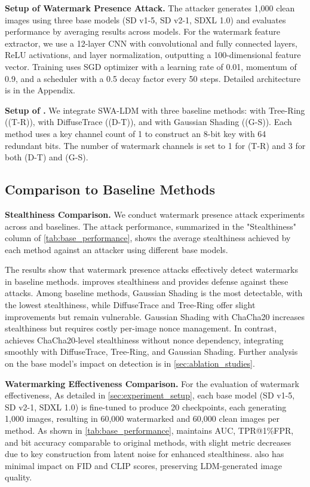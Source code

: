 \noindent
\textbf{Setup of Watermark Presence Attack.}  
The attacker generates 1,000 clean images using three base models (SD v1-5, SD v2-1, SDXL 1.0) and evaluates performance by averaging results across models. For the watermark feature extractor, we use a 12-layer CNN with convolutional and fully connected layers, ReLU activations, and layer normalization, outputting a 100-dimensional feature vector. Training uses SGD optimizer with a learning rate of 0.01, momentum of 0.9, and a scheduler with a 0.5 decay factor every 50 steps. Detailed architecture is in the Appendix.

\noindent
\textbf{Setup of \tool{}.} 
We integrate SWA-LDM with three baseline methods: \tool with Tree-Ring (\tool{}(T-R)), \tool with DiffuseTrace (\tool{}(D-T)), and \tool with Gaussian Shading (\tool{}(G-S)). Each method uses a key channel count of 1 to construct an 8-bit key with 64 redundant bits. The number of watermark channels is set to 1 for \tool{}(T-R) and 3 for both \tool{}(D-T) and \tool{}(G-S).


\subsection{Comparison to Baseline Methods}
\label{sec:comparison_baselines}

\noindent
\textbf{Stealthiness Comparison.}
We conduct watermark presence attack experiments across \tool and baselines. The attack performance, summarized in the "Stealthiness" column of \cref{tab:base_performance}, shows the average stealthiness achieved by each method against an attacker using different base models. 

The results show that watermark presence attacks effectively detect watermarks in baseline methods. \tool improves stealthiness and provides defense against these attacks. Among baseline methods, Gaussian Shading is the most detectable, with the lowest stealthiness, while DiffuseTrace and Tree-Ring offer slight improvements but remain vulnerable. Gaussian Shading with ChaCha20 increases stealthiness but requires costly per-image nonce management. In contrast, \tool achieves ChaCha20-level stealthiness without nonce dependency, integrating smoothly with DiffuseTrace, Tree-Ring, and Gaussian Shading. Further analysis on the base model’s impact on detection is in \cref{sec:ablation_studies}.


\noindent
\textbf{Watermarking Effectiveness Comparison.}
For the evaluation of watermark effectiveness, As detailed in \cref{sec:experiment_setup}, each base model (SD v1-5, SD v2-1, SDXL 1.0) is fine-tuned to produce 20 checkpoints, each generating 1,000 images, resulting in 60,000 watermarked and 60,000 clean images per method. As shown in \cref{tab:base_performance}, \tool maintains AUC, TPR@1\%FPR, and bit accuracy comparable to original methods, with slight metric decreases due to key construction from latent noise for enhanced stealthiness. \tool also has minimal impact on FID and CLIP scores, preserving LDM-generated image quality.

